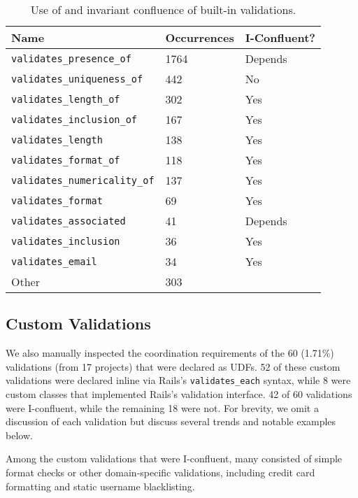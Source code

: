 \begin{table}
\begin{center}
\small
\begin{tabular}{|l l l |}
\hline
Name & Occurrences & I-Confluent?\\\hline
\texttt{validates\_presence\_of} & 1764 & Depends\\
\texttt{validates\_uniqueness\_of} & 442 & No \\
\texttt{validates\_length\_of} & 302 & Yes \\
\texttt{validates\_inclusion\_of} & 167 & Yes\\
\texttt{validates\_length} & 138 & Yes \\
\texttt{validates\_format\_of} & 118 & Yes\\
\texttt{validates\_numericality\_of} & 137 & Yes \\
\texttt{validates\_format} & 69 & Yes \\
\texttt{validates\_associated} & 41 & Depends\\
\texttt{validates\_inclusion} & 36 & Yes \\
\texttt{validates\_email} & 34 & Yes \\
Other & 303 & \\\hline
\end{tabular}
\end{center}\vspace{-1em}
\caption{Use of and invariant confluence of built-in validations.}
\label{table:builtins}
\end{table}

\subsection{Custom Validations}

We also manually inspected the coordination requirements of the 60
(1.71\%) validations (from 17 projects) that were declared as UDFs. 52
of these custom validations were declared inline via Rails's
\texttt{validates\_each} syntax, while 8 were custom classes that
implemented Rails's validation interface. 42 of 60 validations were
I-confluent, while the remaining 18 were not. For brevity, we omit a
discussion of each validation but discuss several trends and notable
examples below.

Among the custom validations that were I-confluent, many consisted of
simple format checks or other domain-specific validations, including
credit card formatting and static username blacklisting.

